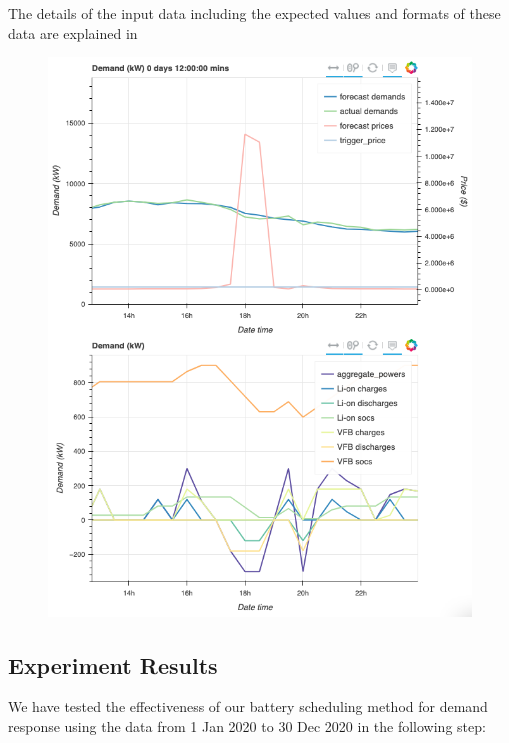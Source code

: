 The details of the input data including the expected values and formats of these data are explained in %
\begin{figure}[p]
	\centering
	\includegraphics[width=1\linewidth]{pics/dr-demo}
	\caption{}
	\label{fig:dr-demo}
\end{figure}

\subsection{Experiment Results}

We have tested the effectiveness of our battery scheduling method for demand response using the data from 1 Jan 2020 to 30 Dec 2020 in the following step: